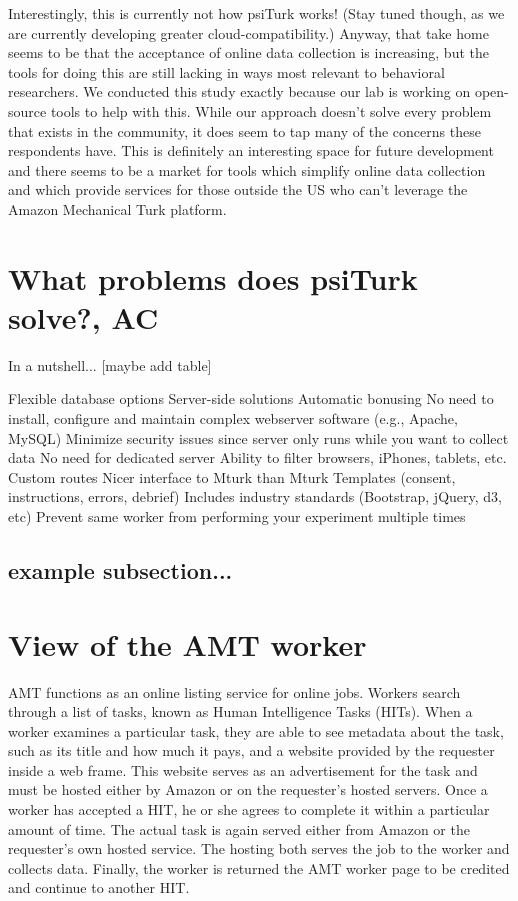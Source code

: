 \documentclass[jou,apacite]{apa6}
\begin{document}
Interestingly, this is currently not how psiTurk works! (Stay tuned though, as we are currently developing greater cloud-compatibility.)
Anyway, that take home seems to be that the acceptance of online data collection is increasing, but the tools for doing this are still lacking in ways most relevant to behavioral researchers.
We conducted this study exactly because our lab is working on open-source tools to help with this.
While our approach doesn't solve every problem that exists in the community, it does seem to tap many of the concerns these respondents have.
This is definitely an interesting space for future development and there seems to be a market for tools which simplify online data collection and which provide services for those outside the US who can't leverage the Amazon Mechanical Turk platform.



\section{What problems does psiTurk solve?, AC}
In a nutshell... [maybe add table]

Flexible database options
Server-side solutions
Automatic bonusing
No need to install, configure and maintain complex webserver software (e.g., Apache, MySQL)
Minimize security issues since server only runs while you want to collect data
No need for dedicated server
Ability to filter browsers, iPhones, tablets, etc. 
Custom routes
Nicer interface to Mturk than Mturk 
Templates (consent, instructions, errors, debrief)
Includes industry standards (Bootstrap, jQuery, d3, etc) 
Prevent same worker from performing your experiment multiple times



\subsection{example subsection...}

\section{View of the AMT worker}
AMT functions as an online listing service for online jobs.
Workers search through a list of tasks, known as Human Intelligence Tasks (HITs). 
When a worker examines a particular task, they are able to see metadata about the task, such as its title and how much it pays, and a website provided by the requester inside a web frame.
This website serves as an advertisement for the task and must be hosted either by Amazon or on the requester's hosted servers.
Once a worker has accepted a HIT, he or she agrees to complete it within a particular amount of time.
The actual task is again served either from Amazon or the requester's own hosted service.
The hosting both serves the job to the worker and collects data.
Finally, the worker is returned the AMT worker page to be credited and continue to another HIT.
\end{document}
